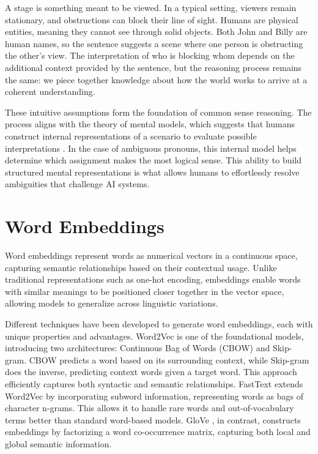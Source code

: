 \documentclass[english,version-2020-11]{uzl-thesis}
\begin{document}
A stage is something meant to be viewed. In a typical setting, viewers remain stationary, and obstructions can block their line of sight. Humans are physical entities, meaning they cannot see through solid objects. Both John and Billy are human names, so the sentence suggests a scene where one person is obstructing the other’s view. The interpretation of who is blocking whom depends on the additional context provided by the sentence, but the reasoning process remains the same: we piece together knowledge about how the world works to arrive at a coherent understanding.

These intuitive assumptions form the foundation of common sense reasoning. The process aligns with the theory of mental models, which suggests that humans construct internal representations of a scenario to evaluate possible interpretations \cite{JohnsonLaird1989}. In the case of ambiguous pronouns, this internal model helps determine which assignment makes the most logical sense. This ability to build structured mental representations is what allows humans to effortlessly resolve ambiguities that challenge AI systems.

\section{Word Embeddings}

Word embeddings represent words as numerical vectors in a continuous space, capturing semantic relationships based on their contextual usage. Unlike traditional representations such as one-hot encoding, embeddings enable words with similar meanings to be positioned closer together in the vector space, allowing models to generalize across linguistic variations. 

Different techniques have been developed to generate word embeddings, each with unique properties and advantages. Word2Vec \cite{Mikolov2013} is one of the foundational models, introducing two architectures: Continuous Bag of Words (CBOW) and Skip-gram. CBOW predicts a word based on its surrounding context, while Skip-gram does the inverse, predicting context words given a target word. This approach efficiently captures both syntactic and semantic relationships. FastText \cite{Bojanowski2017} extends Word2Vec by incorporating subword information, representing words as bags of character n-grams. This allows it to handle rare words and out-of-vocabulary terms better than standard word-based models. GloVe \cite{Pennington2014}, in contrast, constructs embeddings by factorizing a word co-occurrence matrix, capturing both local and global semantic information.
\end{document}
